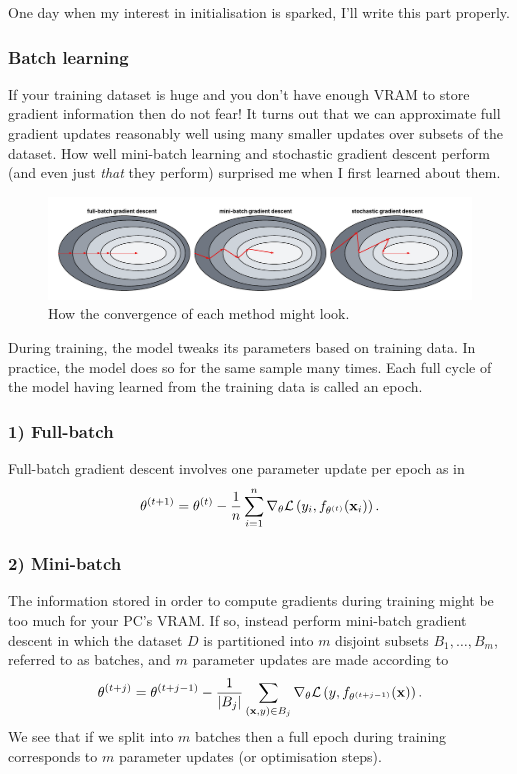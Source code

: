 \documentclass[11pt]{article}
\begin{document}
One day when my interest in initialisation is sparked, I'll write this part properly.

\subsubsection{Batch learning}
If your training dataset is huge and you don't have enough VRAM to store gradient information then do not fear! It turns out that we can approximate full gradient updates reasonably well using many smaller updates over subsets of the dataset. How well mini-batch learning and stochastic gradient descent perform (and even just \textit{that} they perform) surprised me when I first learned about them.

\begin{figure}[t]
    \centering
    \includegraphics[width=\columnwidth]{./figures/gradient_descent/gradient_descent_types.pdf}
    \caption{How the convergence of each method might look.}
    \label{fig:gradient_descent_types}
\end{figure}

\begin{tcolorbox}[title={\centering\textbf{Epoch terminology}}, colback=myLightBlue, colbacktitle=myDarkBlue, colframe=myDarkBlue, coltitle=white]
    During training, the model tweaks its parameters based on training data. In practice, the model does so for the same sample many times. Each full cycle of the model having learned from the training data is called an epoch.
\end{tcolorbox}

\subsubsection*{1) Full-batch}
Full-batch gradient descent involves one parameter update per epoch as in
$$
\theta^{(t+1)}
=
\theta^{(t)}-\frac{1}{n}\sum_{i=1}^n \nabla_{\theta}\mathcal{L}\left(y_i,f_{\theta^{(t)}}(\mathbf{x}_i)\right).
$$

\subsubsection*{2) Mini-batch}
The information stored in order to compute gradients during training might be too much for your PC's VRAM. If so, instead perform mini-batch gradient descent in which the dataset $D$ is partitioned into $m$ disjoint subsets $B_1,\dots,B_m$, referred to as batches, and $m$ parameter updates are made according to
$$
\theta^{(t+j)}
=
\theta^{(t+j-1)}-\frac{1}{|B_j|}\sum_{(\mathbf{x},y)\in B_j} \nabla_{\theta}\mathcal{L}\left(y,f_{\theta^{(t+j-1)}}(\mathbf{x})\right).
$$
We see that if we split into $m$ batches then a full epoch during training corresponds to $m$ parameter updates (or optimisation steps).
\end{document}
